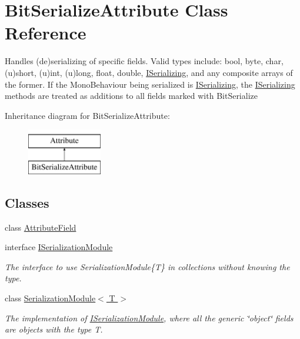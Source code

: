 \hypertarget{class_bit_serialize_attribute}{\section{Bit\-Serialize\-Attribute Class Reference}
\label{class_bit_serialize_attribute}
}


Handles (de)serializing of specific fields. Valid types include\-: bool, byte, char, (u)short, (u)int, (u)long, float, double, \hyperlink{interface_i_serializing}{I\-Serializing}, and any composite arrays of the former. If the Mono\-Behaviour being serialized is \hyperlink{interface_i_serializing}{I\-Serializing}, the \hyperlink{interface_i_serializing}{I\-Serializing} methods are treated as additions to all fields marked with Bit\-Serialize  


Inheritance diagram for Bit\-Serialize\-Attribute\-:\begin{figure}[H]
\begin{center}
\leavevmode
\includegraphics[height=2.000000cm]{class_bit_serialize_attribute}
\end{center}
\end{figure}
\subsection*{Classes}
\begin{DoxyCompactItemize}
\item 
class \hyperlink{class_bit_serialize_attribute_1_1_attribute_field}{Attribute\-Field}
\item 
interface \hyperlink{interface_bit_serialize_attribute_1_1_i_serialization_module}{I\-Serialization\-Module}
\begin{DoxyCompactList}\small\item\em The interface to use Serialization\-Module\{\-T\} in collections without knowing the type. \end{DoxyCompactList}\item 
class \hyperlink{class_bit_serialize_attribute_1_1_serialization_module_3_01_t_01_4}{Serialization\-Module$<$ T $>$}
\begin{DoxyCompactList}\small\item\em The implementation of \hyperlink{interface_bit_serialize_attribute_1_1_i_serialization_module}{I\-Serialization\-Module}, where all the generic \char`\"{}object\char`\"{} fields are objects with the type T. \end{DoxyCompactList}\end{DoxyCompactItemize}
